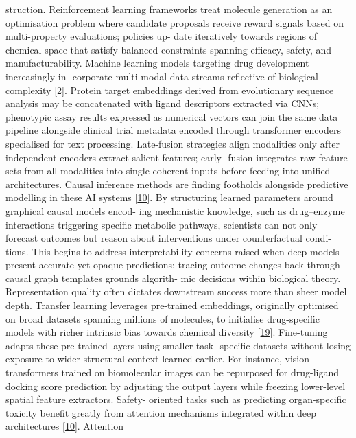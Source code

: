 \documentclass[
]{article}
\begin{document}
struction. Reinforcement learning frameworks treat molecule generation
as an optimisation problem where candidate proposals receive reward
signals based on multi-property evaluations; policies up- date
iteratively towards regions of chemical space that satisfy balanced
constraints spanning efficacy, safety, and manufacturability. Machine
learning models targeting drug development increasingly in- corporate
multi-modal data streams reflective of biological complexity
{[}\protect\hyperlink{_bookmark42}{2}{]}. Protein target embeddings
derived from evolutionary sequence analysis may be concatenated with
ligand descriptors extracted via CNNs; phenotypic assay results
expressed as numerical vectors can join the same data pipeline alongside
clinical trial metadata encoded through transformer encoders specialised
for text processing. Late-fusion strategies align modalities only after
independent encoders extract salient features; early- fusion integrates
raw feature sets from all modalities into single coherent inputs before
feeding into unified architectures. Causal inference methods are finding
footholds alongside predictive modelling in these AI systems
{[}\protect\hyperlink{_bookmark50}{10}{]}. By structuring learned
parameters around graphical causal models encod- ing mechanistic
knowledge, such as drug--enzyme interactions triggering specific
metabolic pathways, scientists can not only forecast outcomes but reason
about interventions under counterfactual condi- tions. This begins to
address interpretability concerns raised when deep models present
accurate yet opaque predictions; tracing outcome changes back through
causal graph templates grounds algorith- mic decisions within biological
theory. Representation quality often dictates downstream success more
than sheer model depth. Transfer learning leverages pre-trained
embeddings, originally optimised on broad datasets spanning millions of
molecules, to initialise drug-specific models with richer intrinsic bias
towards chemical diversity {[}\protect\hyperlink{_bookmark59}{19}{]}.
Fine-tuning adapts these pre-trained layers using smaller task- specific
datasets without losing exposure to wider structural context learned
earlier. For instance, vision transformers trained on biomolecular
images can be repurposed for drug-ligand docking score prediction by
adjusting the output layers while freezing lower-level spatial feature
extractors. Safety- oriented tasks such as predicting organ-specific
toxicity benefit greatly from attention mechanisms integrated within
deep architectures {[}\protect\hyperlink{_bookmark50}{10}{]}. Attention
\end{document}
